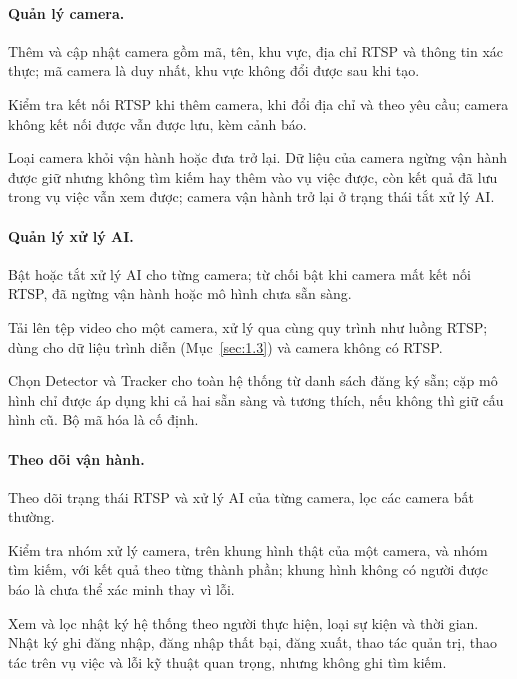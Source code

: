 \paragraph{Quản lý camera.}
\begin{reqlist}
    \item[FR-A03] Thêm và cập nhật camera gồm mã, tên, khu vực, địa chỉ RTSP và thông tin xác thực; mã camera là duy nhất, khu vực không đổi được sau khi tạo.
    \item[FR-A04] Kiểm tra kết nối RTSP khi thêm camera, khi đổi địa chỉ và theo yêu cầu; camera không kết nối được vẫn được lưu, kèm cảnh báo.
    \item[FR-A05] Loại camera khỏi vận hành hoặc đưa trở lại. Dữ liệu của camera ngừng vận hành được giữ nhưng không tìm kiếm hay thêm vào vụ việc được, còn kết quả đã lưu trong vụ việc vẫn xem được; camera vận hành trở lại ở trạng thái tắt xử lý AI.
\end{reqlist}

\paragraph{Quản lý xử lý AI.}
\begin{reqlist}
    \item[FR-A06] Bật hoặc tắt xử lý AI cho từng camera; từ chối bật khi camera mất kết nối RTSP, đã ngừng vận hành hoặc mô hình chưa sẵn sàng.
    \item[FR-A07] Tải lên tệp video cho một camera, xử lý qua cùng quy trình như luồng RTSP; dùng cho dữ liệu trình diễn (Mục~\ref{sec:1.3}) và camera không có RTSP.
    \item[FR-A08] Chọn Detector và Tracker cho toàn hệ thống từ danh sách đăng ký sẵn; cặp mô hình chỉ được áp dụng khi cả hai sẵn sàng và tương thích, nếu không thì giữ cấu hình cũ. Bộ mã hóa là cố định.
\end{reqlist}

\paragraph{Theo dõi vận hành.}
\begin{reqlist}
    \item[FR-A09] Theo dõi trạng thái RTSP và xử lý AI của từng camera, lọc các camera bất thường.
    \item[FR-A10] Kiểm tra nhóm xử lý camera, trên khung hình thật của một camera, và nhóm tìm kiếm, với kết quả theo từng thành phần; khung hình không có người được báo là chưa thể xác minh thay vì lỗi.
    \item[FR-A11] Xem và lọc nhật ký hệ thống theo người thực hiện, loại sự kiện và thời gian. Nhật ký ghi đăng nhập, đăng nhập thất bại, đăng xuất, thao tác quản trị, thao tác trên vụ việc và lỗi kỹ thuật quan trọng, nhưng không ghi tìm kiếm.
\end{reqlist}

